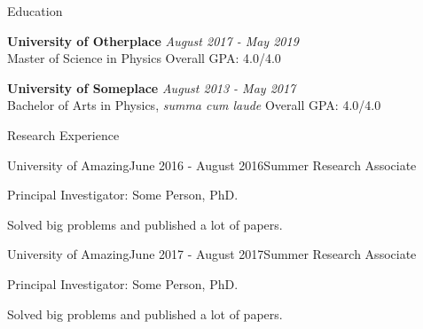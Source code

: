 \documentclass{resume} %
\begin{document}

\begin{rSection}{Education}

{\bf University of Otherplace} \hfill {\em August 2017 - May 2019} 
\\ Master of Science in Physics \hfill { Overall GPA: 4.0/4.0}

{\bf University of Someplace} \hfill {\em August 2013 - May 2017} 
\\ Bachelor of Arts in Physics, \textit{summa cum laude} \hfill { Overall GPA: 4.0/4.0}

\end{rSection}


\begin{rSection}{Research Experience}

\begin{rSubsection}{University of Amazing}{June 2016 - August 2016}{Summer Research Associate}{}
\item Principal Investigator: Some Person, PhD.
\item Solved big problems and published a lot of papers.
\end{rSubsection}


\begin{rSubsection}{University of Amazing}{June 2017 - August 2017}{Summer Research Associate}{}
\item Principal Investigator: Some Person, PhD.
\item Solved big problems and published a lot of papers.
\end{rSubsection}

\end{rSection}

\end{document}
